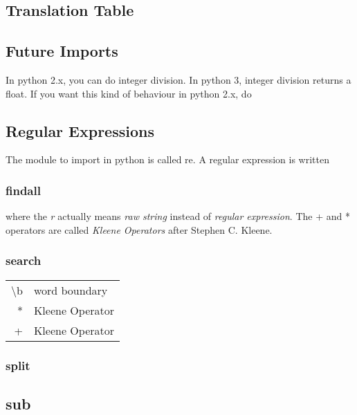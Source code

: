 \documentclass[12pt]{article}
\begin{document}
\subsection{Translation Table}


\subsection{Future Imports}

In python 2.x, you can do integer division. In python 3, integer division returns a float. If you want this kind of behaviour in python 2.x, do



\subsection{Regular Expressions}
The module to import in python is called re. A regular expression is written

\subsubsection{findall}


where the \emph{r} actually means \emph{raw string} instead of \emph{regular expression}. The + and * operators are called \emph{Kleene Operators} after Stephen C. Kleene.

\subsubsection{search}


\begin{tabular}{r | l}
	\textbackslash b & word boundary \\
	* & Kleene Operator \\
	+ & Kleene Operator
\end{tabular}

\subsubsection{split}


\subsection{sub}

\end{document}
